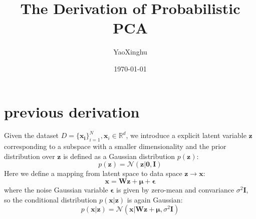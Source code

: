 \documentclass{article}
\title{The Derivation of Probabilistic PCA}
\author{YaoXinghu}
\date{\today}
\begin{document}
	\maketitle
	\section{previous derivation}
	Given the dataset $D=\{\mathbf{x_i}\}_{i=1}^N, \mathbf x_i \in \mathbb R^d $, we introduce a explicit latent variable $\mathbf{z}$ corresponding to a subspace with a smaller dimensionality and the prior distribution over $\mathbf z$ is defined as a Gaussian distribution $p\left(\mathbf z \right)$:
	\begin{equation}
		 p\left(\mathbf z \right) = \mathcal N \left(\mathbf z|\mathbf 0, \mathbf I \right)\label{eq:prior}
	\end{equation}
     Here we define a mapping from latent space to data space $\mathbf z \rightarrow \mathbf x$:
     \begin{equation}
     	\mathbf x = \mathbf W \mathbf z + \boldsymbol \mu + \boldsymbol \epsilon
     \end{equation}
     where the noise Gaussian variable $\boldsymbol \epsilon$ is given by zero-mean and convariance $ \sigma^2 \mathbf I$, so the conditional distribution $p\left(\mathbf x|\mathbf z \right)$ is again Gaussian:
     \begin{equation}
     	p\left(\mathbf x|\mathbf z \right) = \mathcal N \left(\mathbf x|\mathbf W \mathbf z + \boldsymbol \mu, \sigma^2 \mathbf I \right)\label{eq:conditional}
     \end{equation}
\end{document}
